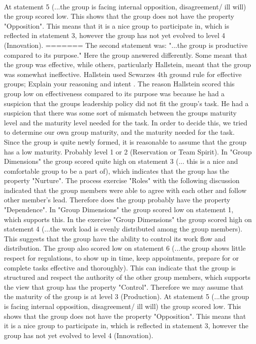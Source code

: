 \\
At statement 5 (...the group is facing internal opposition, disagreement/ ill will) the group scored low. This shows that the group does not have the property "Opposition". This means that it is a nice group to participate in, which is reflected in statement 3, however the group has not yet evolved to level 4 (Innovation).
=======
The second statement was: "...the group is productive compared to its purpose." Here the group answered differently. Some meant that the group was effective, while others, particularly Hallstein, meant that the group was somewhat ineffective. Hallstein used Scwarzes 4th ground rule for effective groups; Explain your reasoning and intent \cite{EffectiveGroups}. The reason Hallstein scored this group low on effectiveness compared to its purpose was because he had a suspicion that the groups leadership policy did not fit the group's task. He had a suspicion that there was some sort of mismatch between the groups maturity level and the maturity level needed for the task. In order to decide this, we tried to determine our own group maturity, and the maturity needed for the task.  
	Since the group is quite newly formed, it is reasonable to assume that the group has a low maturity. Probably level 1 or 2 (Reservation or Team Spirit). In "Group Dimensions" the group scored quite high on statement 3 (... this is a nice and comfortable group to be a part of), which indicates that the group has the property "Nurture". The process exercise "Roles" with the following discussion indicated that the group members were able to agree with each other and follow other member's lead. Therefore does the group probably have the property "Dependence". In "Group Dimensions" the group scored low on statement 1, which supports this. 
	In the exercise "Group Dimensions" the group scored high on statement 4 (...the work load is evenly distributed among the group members). This suggests that the group have the ability to control its work flow and distribution. The group also scored low on statement 6 (...the group shows little respect for regulations, to show up in time, keep appointments, prepare for or complete tasks effective and thoroughly). This can indicate that the group is structured and respect the authority of the other group members, which supports the view that group has the property "Control". Therefore we may assume that the maturity of the group is at level 3 (Production).
	At statement 5 (...the group is facing internal opposition, disagreement/ ill will) the group scored low. This shows that the group does not have the property "Opposition". This means that it is a nice group to participate in, which is reflected in statement 3, however the group has not yet evolved to level 4 (Innovation).
